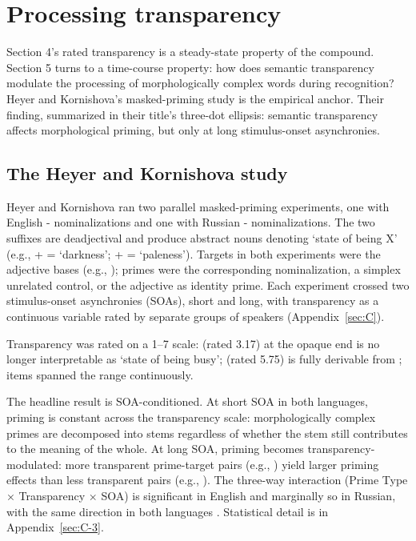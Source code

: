 \section{Processing transparency}\label{sec:5}

Section 4's rated transparency is a steady-state property of the compound. Section 5 turns to a time-course property: how does semantic transparency modulate the processing of morphologically complex words during recognition? Heyer and Kornishova's \autocite*{heyer-kornishova-2018-priming-eventually} masked-priming study is the empirical anchor. Their finding, summarized in their title's three-dot ellipsis: semantic transparency affects morphological priming, but only at long stimulus-onset asynchronies.

\subsection{The Heyer and Kornishova study}

Heyer and Kornishova \autocite*{heyer-kornishova-2018-priming-eventually} ran two parallel masked-priming experiments, one with English - nominalizations and one with Russian - nominalizations. The two suffixes are deadjectival and produce abstract nouns denoting `state of being X' (e.g.,  +  = `darkness';  +  =  `paleness'). Targets in both experiments were the adjective bases (e.g., ); primes were the corresponding nominalization, a simplex unrelated control, or the adjective as identity prime. Each experiment crossed two stimulus-onset asynchronies (SOAs), short and long, with transparency as a continuous variable rated by separate groups of speakers (Appendix~\ref{sec:C}).

Transparency was rated on a 1--7 scale:  (rated 3.17) at the opaque end is no longer interpretable as `state of being busy';  (rated 5.75) is fully derivable from ; items spanned the range continuously.

The headline result is SOA-conditioned. At short SOA in both languages, priming is constant across the transparency scale: morphologically complex primes are decomposed into stems regardless of whether the stem still contributes to the meaning of the whole. At long SOA, priming becomes transparency-modulated: more transparent prime-target pairs (e.g., ) yield larger priming effects than less transparent pairs (e.g., ). The three-way interaction (Prime Type × Transparency × SOA) is significant in English and marginally so in Russian, with the same direction in both languages \autocite[1117--1119]{heyer-kornishova-2018-priming-eventually}. Statistical detail is in Appendix~\ref{sec:C-3}.


